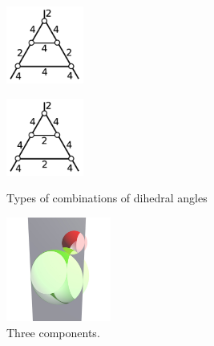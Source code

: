 \documentclass[suppldata, dvipdfmx]{interact}
\theoremstyle{plain}%
\theoremstyle{definition}
\theoremstyle{remark}
\theoremstyle{problemstyle}
\begin{document}
\begin{figure}[h!tbp]
\begin{minipage}[t]{0.23\textwidth}
  \end{minipage}
 \hspace*{\fill}
  \begin{minipage}[t]{0.23\textwidth}
   \centering
   \includegraphics[width=1in, keepaspectratio]{./img/HexahedraWithSphericalFaces/pentahedralPrism/e.jpg}
   \label{fig:pentahedralPrismType5}
  \end{minipage}
 \hspace*{\fill}
  \begin{minipage}[t]{0.23\textwidth}
   \centering
   \includegraphics[width=1in, keepaspectratio]{./img/HexahedraWithSphericalFaces/pentahedralPrism/f.jpg}
   \label{fig:pentahedralPrismType6}
  \end{minipage}
 \hspace*{\fill}
  \caption{Types of combinations of dihedral angles}
  \label{fig:triangularPrismDihedralAngles}
\end{figure}

\begin{figure}[h!tbp]
   \centering
   \includegraphics[width=1.35in, height=1.35in, keepaspectratio]{./img/sphairahedron/pentahedralPrism/prismAll.jpg}
  \caption{Three components.}
  \label{fig:triangularPrismThreeComponents}
\end{figure}
\end{document}
